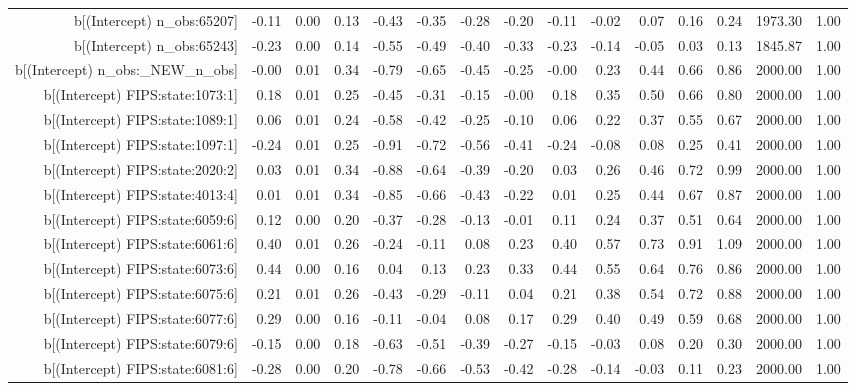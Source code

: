 \begin{table}[ht]
\begin{tabular}{rrrrrrrrrrrrrrr}
  b[(Intercept) n\_obs:65207] & -0.11 & 0.00 & 0.13 & -0.43 & -0.35 & -0.28 & -0.20 & -0.11 & -0.02 & 0.07 & 0.16 & 0.24 & 1973.30 & 1.00 \\ 
  b[(Intercept) n\_obs:65243] & -0.23 & 0.00 & 0.14 & -0.55 & -0.49 & -0.40 & -0.33 & -0.23 & -0.14 & -0.05 & 0.03 & 0.13 & 1845.87 & 1.00 \\ 
  b[(Intercept) n\_obs:\_NEW\_n\_obs] & -0.00 & 0.01 & 0.34 & -0.79 & -0.65 & -0.45 & -0.25 & -0.00 & 0.23 & 0.44 & 0.66 & 0.86 & 2000.00 & 1.00 \\ 
  b[(Intercept) FIPS:state:1073:1] & 0.18 & 0.01 & 0.25 & -0.45 & -0.31 & -0.15 & -0.00 & 0.18 & 0.35 & 0.50 & 0.66 & 0.80 & 2000.00 & 1.00 \\ 
  b[(Intercept) FIPS:state:1089:1] & 0.06 & 0.01 & 0.24 & -0.58 & -0.42 & -0.25 & -0.10 & 0.06 & 0.22 & 0.37 & 0.55 & 0.67 & 2000.00 & 1.00 \\ 
  b[(Intercept) FIPS:state:1097:1] & -0.24 & 0.01 & 0.25 & -0.91 & -0.72 & -0.56 & -0.41 & -0.24 & -0.08 & 0.08 & 0.25 & 0.41 & 2000.00 & 1.00 \\ 
  b[(Intercept) FIPS:state:2020:2] & 0.03 & 0.01 & 0.34 & -0.88 & -0.64 & -0.39 & -0.20 & 0.03 & 0.26 & 0.46 & 0.72 & 0.99 & 2000.00 & 1.00 \\ 
  b[(Intercept) FIPS:state:4013:4] & 0.01 & 0.01 & 0.34 & -0.85 & -0.66 & -0.43 & -0.22 & 0.01 & 0.25 & 0.44 & 0.67 & 0.87 & 2000.00 & 1.00 \\ 
  b[(Intercept) FIPS:state:6059:6] & 0.12 & 0.00 & 0.20 & -0.37 & -0.28 & -0.13 & -0.01 & 0.11 & 0.24 & 0.37 & 0.51 & 0.64 & 2000.00 & 1.00 \\ 
  b[(Intercept) FIPS:state:6061:6] & 0.40 & 0.01 & 0.26 & -0.24 & -0.11 & 0.08 & 0.23 & 0.40 & 0.57 & 0.73 & 0.91 & 1.09 & 2000.00 & 1.00 \\ 
  b[(Intercept) FIPS:state:6073:6] & 0.44 & 0.00 & 0.16 & 0.04 & 0.13 & 0.23 & 0.33 & 0.44 & 0.55 & 0.64 & 0.76 & 0.86 & 2000.00 & 1.00 \\ 
  b[(Intercept) FIPS:state:6075:6] & 0.21 & 0.01 & 0.26 & -0.43 & -0.29 & -0.11 & 0.04 & 0.21 & 0.38 & 0.54 & 0.72 & 0.88 & 2000.00 & 1.00 \\ 
  b[(Intercept) FIPS:state:6077:6] & 0.29 & 0.00 & 0.16 & -0.11 & -0.04 & 0.08 & 0.17 & 0.29 & 0.40 & 0.49 & 0.59 & 0.68 & 2000.00 & 1.00 \\ 
  b[(Intercept) FIPS:state:6079:6] & -0.15 & 0.00 & 0.18 & -0.63 & -0.51 & -0.39 & -0.27 & -0.15 & -0.03 & 0.08 & 0.20 & 0.30 & 2000.00 & 1.00 \\ 
  b[(Intercept) FIPS:state:6081:6] & -0.28 & 0.00 & 0.20 & -0.78 & -0.66 & -0.53 & -0.42 & -0.28 & -0.14 & -0.03 & 0.11 & 0.23 & 2000.00 & 1.00 \\ 

\end{tabular}
\end{table}

